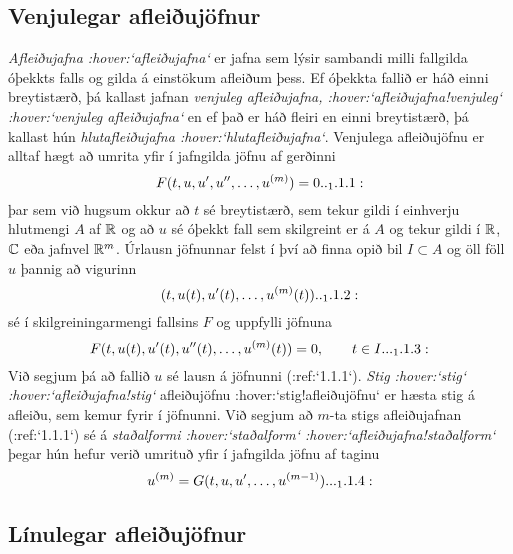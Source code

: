 \subsection*{Venjulegar afleiðujöfnur}

{\it Afleiðujafna :hover:`afleiðujafna`} er  jafna sem lýsir
sambandi milli fallgilda óþekkts falls og gilda á einstökum 
afleiðum þess.  Ef óþekkta fallið er háð einni breytistærð, 
þá kallast jafnan {\it venjuleg afleiðujafna,
 :hover:`afleiðujafna!venjuleg` :hover:`venjuleg afleiðujafna`} 
en ef það er háð fleiri en einni breytistærð, þá
kallast hún {\it hlutafleiðujafna :hover:`hlutafleiðujafna`}.  
Venjulega afleiðujöfnu er alltaf hægt að umrita yfir í jafngilda jöfnu
af gerðinni
\begin{equation*}
F(t,u,u',u\ddash,\dots,u\sp{(m)})=0 

.. _1.1.1:

\end{equation*}
þar sem við hugsum okkur að $t$ sé breytistærð, sem tekur gildi í
einhverju hlutmengi $A$ af ${\mathbb R}$ og að $u$ sé óþekkt fall sem skilgreint er
á $A$ og tekur gildi í ${\mathbb R}$, ${\mathbb C}$ eða jafnvel ${\mathbb R}^m$.  
Úrlausn jöfnunnar felst í því að finna opið bil $I\subset A$ og
öll föll $u$ þannig að vigurinn
 \begin{equation*}(t,u(t),u\dash(t),\dots,u\sp{(m)}(t))

.. _1.1.2:

 \end{equation*}
sé í skilgreiningarmengi fallsins $F$ og uppfylli jöfnuna
 \begin{equation*}F(t,u(t),u'(t),u\ddash(t),\dots,u\sp{(m)}(t))=0,
 \qquad t\in I.

.. _1.1.3:

 \end{equation*}
Við  segjum  þá að fallið $u$ sé lausn á jöfnunni (:ref:`1.1.1`).
{\it Stig :hover:`stig` :hover:`afleiðujafna!stig`}
afleiðujöfnu :hover:`stig!afleiðujöfnu` er hæsta stig á afleiðu, sem
kemur fyrir í jöfnunni.  
Við segjum að $m$-ta stigs afleiðujafnan (:ref:`1.1.1`) sé á 
{\it staðalformi :hover:`staðalform` :hover:`afleiðujafna!staðalform`}
þegar hún hefur verið umrituð yfir í jafngilda jöfnu af taginu
 \begin{equation*}u\sp{(m)}=G(t,u,u',\dots,u\sp{(m-1)}).

.. _1.1.4:

 \end{equation*}

\subsection*{Línulegar afleiðujöfnur}

